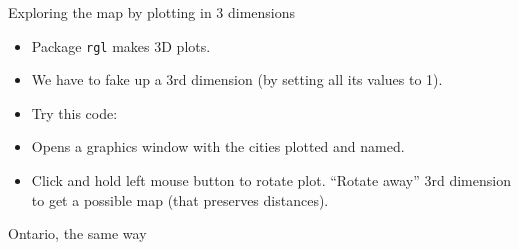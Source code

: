 \begin{frame}[fragile]{Exploring the map by plotting in 3 dimensions}
  
  \begin{itemize}
  \item Package \texttt{rgl} makes 3D plots.
  \item We have to fake up a 3rd dimension (by setting all its values
    to 1).
  \item Try this code:
\begin{knitrout}
\color{fgcolor}\begin{kframe}
\begin{alltt}
\hlkwb{=}\hlstd{)}
\hlstd{=}\hlstd{(}\hlopt{-}\hlstd{,}\hlstd{))}
\hlopt{$}
\end{alltt}
\end{kframe}
\end{knitrout}
\item Opens a graphics window with the cities plotted and named.
\item Click and hold left mouse button to rotate plot. ``Rotate away''
  3rd dimension to get a possible map (that preserves distances). 
  \end{itemize}
  
\end{frame}


\begin{frame}[fragile]{Ontario, the same way}
  
\begin{knitrout}
\color{fgcolor}\begin{kframe}
\begin{alltt}
\hlkwb{=}\hlstd{(}\hlstd{,}
\hlkwb{=}
\hlkwb{=}
\hlkwb{=}\hlstd{=}
\hlkwb{=}\hlstd{(}\hlopt{+}
  \hlstd{()}\hlopt{+}\hlstd{()}\hlopt{+}
  \hlstd{()}
\end{alltt}
\end{kframe}
\end{knitrout}

  
\end{frame}

